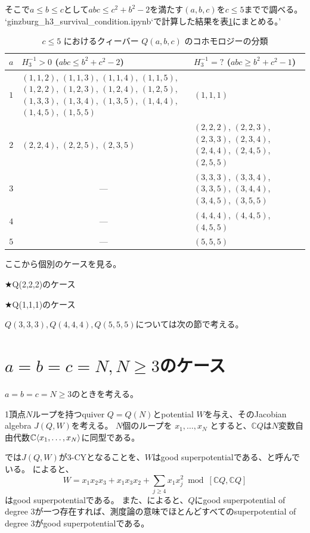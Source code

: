 \documentclass[uplatex,12pt,dvipdfmx]{jsarticle}
\theoremstyle{definition}
\numberwithin{equation}{section}
\newcommand{\Complex}{\mathbb{C}}
\DeclarePairedDelimiter{\abra}{\langle}{\rangle} %
\begin{document}
そこで$a\le b\le c$として$abc \le c^2 + b^2 - 2$を満たす$(a,b,c)$を$c\le 5$までで調べる。
`ginzburg\_h3\_survival\_condition.ipynb`で計算した結果を表\ref{tab:quiver_c5_classification}にまとめる。'

\begin{table}[htbp]
  \centering
  \caption{$c \leq 5$ におけるクィーバー $Q(a,b,c)$ のコホモロジーの分類}
  \label{tab:quiver_c5_classification}
  \renewcommand{\arraystretch}{1.3} %
  \begin{tabular}{c p{6.5cm} p{6.5cm}}
    \hline
    $a$ & \textbf{$H_3^{-1}>0$} ($abc \leq b^2+c^2-2$) & \textbf{$H_3^{-1}=?$} ($abc \geq b^2+c^2-1$) \\
    \hline
    $1$ & $(1,1,2)$, $(1,1,3)$, $(1,1,4)$, $(1,1,5)$, $(1,2,2)$, $(1,2,3)$, $(1,2,4)$, $(1,2,5)$, $(1,3,3)$, $(1,3,4)$, $(1,3,5)$, $(1,4,4)$, $(1,4,5)$, $(1,5,5)$ & $(1,1,1)$ \\
    $2$ & $(2,2,4)$, $(2,2,5)$, $(2,3,5)$ & $(2,2,2)$, $(2,2,3)$, $(2,3,3)$, $(2,3,4)$, $(2,4,4)$, $(2,4,5)$, $(2,5,5)$ \\
    $3$ & \multicolumn{1}{c}{---} & $(3,3,3)$, $(3,3,4)$, $(3,3,5)$, $(3,4,4)$, $(3,4,5)$, $(3,5,5)$ \\
    $4$ & \multicolumn{1}{c}{---} & $(4,4,4)$, $(4,4,5)$, $(4,5,5)$ \\
    $5$ & \multicolumn{1}{c}{---} & $(5,5,5)$ \\
    \hline
  \end{tabular}
\end{table}

ここから個別のケースを見る。

★Q(2,2,2)のケース



★Q(1,1,1)のケース




$Q(3,3,3), Q(4,4,4), Q(5,5,5)$については次の節で考える。

\section{$a=b=c=N,N\ge3$のケース}

$a=b=c=N\ge 3$のときを考える。

1頂点$N$ループを持つquiver $Q=Q(N)$とpotential $W$を与え、そのJacobian algebra $J(Q,W)$を考える。
$N$個のループを $x_1,\ldots,x_N$ とすると、$\Complex Q$は$N$変数自由代数$\Complex\abra{x_1,\ldots,x_N}$に同型である。

\cite{MR2355031}では$J(Q,W)$が$3$-CYとなることを、$W$はgood superpotentialである、と呼んでいる。
\cite[Lemma 5.2]{MR2355031}によると、
\begin{equation}
	W = x_1x_2x_3 + x_1x_3x_2 + \sum_{j\ge 4}x_1x_j^2 \bmod [\Complex Q, \Complex Q]
\end{equation}
はgood superpotentialである。
また、\cite[Corollary 4.4]{MR2355031}によると、$Q$にgood superpotential of degree $3$が一つ存在すれば、測度論の意味でほとんどすべてのsuperpotential of degree $3$がgood superpotentialである。
\end{document}
